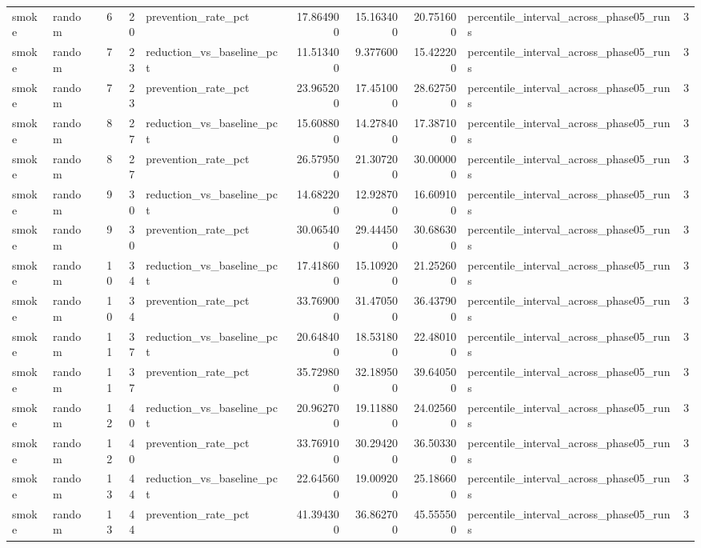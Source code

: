 \begin{tabular}{llrrlrrrlr}
smoke & random & 6 & 20 & prevention\_rate\_pct & 17.864900 & 15.163400 & 20.751600 & percentile\_interval\_across\_phase05\_runs & 3 \\
smoke & random & 7 & 23 & reduction\_vs\_baseline\_pct & 11.513400 & 9.377600 & 15.422200 & percentile\_interval\_across\_phase05\_runs & 3 \\
smoke & random & 7 & 23 & prevention\_rate\_pct & 23.965200 & 17.451000 & 28.627500 & percentile\_interval\_across\_phase05\_runs & 3 \\
smoke & random & 8 & 27 & reduction\_vs\_baseline\_pct & 15.608800 & 14.278400 & 17.387100 & percentile\_interval\_across\_phase05\_runs & 3 \\
smoke & random & 8 & 27 & prevention\_rate\_pct & 26.579500 & 21.307200 & 30.000000 & percentile\_interval\_across\_phase05\_runs & 3 \\
smoke & random & 9 & 30 & reduction\_vs\_baseline\_pct & 14.682200 & 12.928700 & 16.609100 & percentile\_interval\_across\_phase05\_runs & 3 \\
smoke & random & 9 & 30 & prevention\_rate\_pct & 30.065400 & 29.444500 & 30.686300 & percentile\_interval\_across\_phase05\_runs & 3 \\
smoke & random & 10 & 34 & reduction\_vs\_baseline\_pct & 17.418600 & 15.109200 & 21.252600 & percentile\_interval\_across\_phase05\_runs & 3 \\
smoke & random & 10 & 34 & prevention\_rate\_pct & 33.769000 & 31.470500 & 36.437900 & percentile\_interval\_across\_phase05\_runs & 3 \\
smoke & random & 11 & 37 & reduction\_vs\_baseline\_pct & 20.648400 & 18.531800 & 22.480100 & percentile\_interval\_across\_phase05\_runs & 3 \\
smoke & random & 11 & 37 & prevention\_rate\_pct & 35.729800 & 32.189500 & 39.640500 & percentile\_interval\_across\_phase05\_runs & 3 \\
smoke & random & 12 & 40 & reduction\_vs\_baseline\_pct & 20.962700 & 19.118800 & 24.025600 & percentile\_interval\_across\_phase05\_runs & 3 \\
smoke & random & 12 & 40 & prevention\_rate\_pct & 33.769100 & 30.294200 & 36.503300 & percentile\_interval\_across\_phase05\_runs & 3 \\
smoke & random & 13 & 44 & reduction\_vs\_baseline\_pct & 22.645600 & 19.009200 & 25.186600 & percentile\_interval\_across\_phase05\_runs & 3 \\
smoke & random & 13 & 44 & prevention\_rate\_pct & 41.394300 & 36.862700 & 45.555500 & percentile\_interval\_across\_phase05\_runs & 3 \\

\end{tabular}
